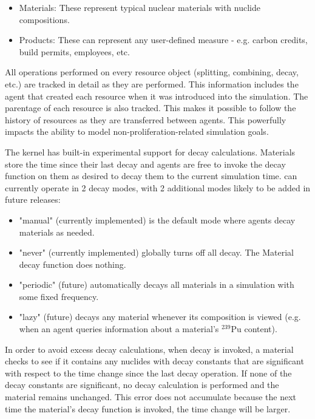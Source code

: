 \begin{itemize}

  \item Materials: These represent typical nuclear materials with
      nuclide compositions.

  \item Products: These can represent any user-defined measure - e.g. carbon
      credits, build permits, employees, etc.

\end{itemize}

All operations performed on every resource object (splitting, combining,
decay, etc.) are tracked in detail as they are performed.  This information
includes the agent that created each resource when it was introduced into the
simulation.  The parentage of each resource is also tracked. This makes it
possible to follow the history of resources as they are transferred between
agents.  This powerfully impacts the ability to model
non-proliferation-related simulation goals.

The \Cyclus kernel has built-in experimental support for decay calculations.
Materials store the time since their last decay and agents are free to
invoke the decay function on them as desired to decay them to the current
simulation time. \Cyclus can currently operate in 2 decay modes, with 2 additional
modes likely to be added in future releases:

\begin{itemize}

    \item "manual" (currently implemented) is the default mode
        where agents decay materials as needed.

    \item "never" (currently implemented) globally turns off all decay.
        The Material decay function does nothing.

    \item "periodic" (future) automatically decays all materials in a
        simulation with some fixed frequency.

    \item "lazy" (future) decays any material whenever its composition is
        viewed (e.g. when an agent queries information about a material's
        $^{239}$Pu content).

\end{itemize}

In order to avoid excess decay calculations, when decay
is invoked, a material checks to see if it contains any nuclides with decay
constants that are significant with respect to the time change since the last
decay operation.  If none of the decay constants are significant, no decay
calculation is performed and the material remains unchanged.  This error does
not accumulate because the next time the material's decay function is invoked,
the time change will be larger.


